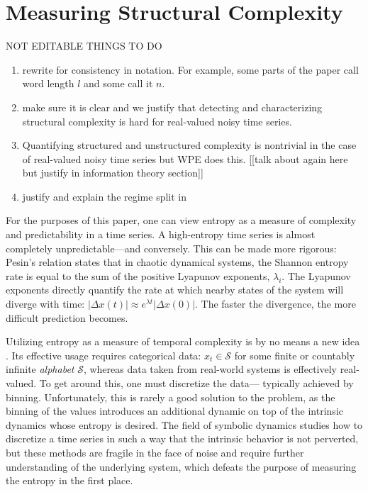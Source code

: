 \section{Measuring Structural Complexity }\label{sec:meaComplex}
{\color{red} NOT EDITABLE}
THINGS TO DO
\begin{enumerate}
\item rewrite for consistency in notation. For example, some parts of the paper call word length $l$ and some call it $n$.

\item make sure it is clear and we justify that detecting and characterizing structural complexity is hard for real-valued noisy time series.
\item Quantifying structured and unstructured complexity is nontrivial in the case of real-valued noisy time series but WPE does this. [[talk about again here but justify in information theory section]]
\item justify and explain the regime split in 
\end{enumerate}


For the purposes of this paper, one can view entropy as a measure of complexity
and predictability in a time series.  A high-entropy time series is almost
completely unpredictable---and conversely.  This can be made more rigorous:
Pesin's relation \cite{pesin77} states that in chaotic dynamical systems, the
Shannon entropy rate is equal to the sum of the positive Lyapunov exponents,
$\lambda_i$. The Lyapunov exponents directly quantify the rate at which nearby
states of the system will diverge with time: $\left| \Delta x(t) \right| \approx
e^{\lambda t} \left| \Delta x(0) \right|$.  The faster the divergence, the more
difficult prediction becomes.

Utilizing entropy as a measure of temporal complexity is by no means a new idea
\cite{Shannon1951, mantegna1994linguistic}.  Its effective usage requires
categorical data: $x_t \in \mathcal{S}$ for some finite or countably infinite
\emph{alphabet} $\mathcal{S}$, whereas data taken from real-world systems is
effectively real-valued.  To get around this, one must discretize the data---
typically achieved by binning.  Unfortunately, this is rarely a good solution to
the problem, as the binning of the values introduces an additional dynamic on
top of the intrinsic dynamics whose entropy is desired.  The field of symbolic
dynamics studies how to discretize a time series in such a way that the
intrinsic behavior is not perverted, but these methods are fragile in the face
of noise and require further understanding of the underlying system, which
defeats the purpose of measuring the entropy in the first place.

